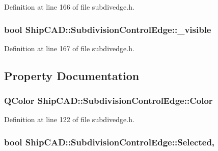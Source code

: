 Definition at line 166 of file subdivedge.\-h.

\hypertarget{classShipCAD_1_1SubdivisionControlEdge_a8d49343e2b6ff0ab13653849af242740}{
\subsubsection[{\-\_\-visible}]{\setlength{\rightskip}{0pt plus 5cm}bool Ship\-C\-A\-D\-::\-Subdivision\-Control\-Edge\-::\-\_\-visible\hspace{0.3cm}{\ttfamily [protected]}}}\label{classShipCAD_1_1SubdivisionControlEdge_a8d49343e2b6ff0ab13653849af242740}


Definition at line 167 of file subdivedge.\-h.



\subsection{Property Documentation}
\hypertarget{classShipCAD_1_1SubdivisionControlEdge_a1aaeec9c0e1dc9d7b49dfe2913e8a0a7}{
\subsubsection[{Color}]{\setlength{\rightskip}{0pt plus 5cm}Q\-Color Ship\-C\-A\-D\-::\-Subdivision\-Control\-Edge\-::\-Color\hspace{0.3cm}{\ttfamily [read]}}}\label{classShipCAD_1_1SubdivisionControlEdge_a1aaeec9c0e1dc9d7b49dfe2913e8a0a7}


Definition at line 122 of file subdivedge.\-h.

\hypertarget{classShipCAD_1_1SubdivisionControlEdge_a25279492599975df97efcaa124e09855}{
\subsubsection[{Selected}]{\setlength{\rightskip}{0pt plus 5cm}bool Ship\-C\-A\-D\-::\-Subdivision\-Control\-Edge\-::\-Selected\hspace{0.3cm}{\ttfamily [read]}, {\ttfamily [write]}}}\label{classShipCAD_1_1SubdivisionControlEdge_a25279492599975df97efcaa124e09855}


